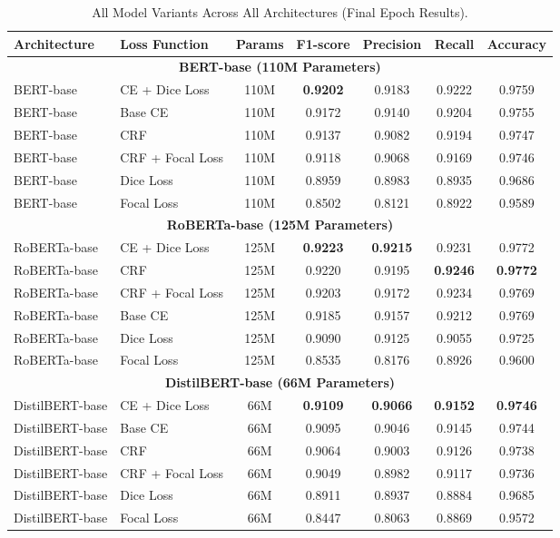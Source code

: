 \begin{table}[H]
    \centering
    \caption{All Model Variants Across All Architectures (Final Epoch Results).}
    \small
    \begin{tabular}{l l c c c c c}
        \hline
        \textbf{Architecture} & \textbf{Loss Function} & \textbf{Params} & \textbf{F1-score} & \textbf{Precision} & \textbf{Recall} & \textbf{Accuracy} \\
        \hline
        \multicolumn{7}{c}{\textbf{BERT-base (110M Parameters)}} \\
        \hline
        BERT-base & CE + Dice Loss & 110M & \textbf{0.9202} & 0.9183 & 0.9222 & 0.9759 \\
        BERT-base & Base CE & 110M & 0.9172 & 0.9140 & 0.9204 & 0.9755 \\
        BERT-base & CRF & 110M & 0.9137 & 0.9082 & 0.9194 & 0.9747 \\
        BERT-base & CRF + Focal Loss & 110M & 0.9118 & 0.9068 & 0.9169 & 0.9746 \\
        BERT-base & Dice Loss & 110M & 0.8959 & 0.8983 & 0.8935 & 0.9686 \\
        BERT-base & Focal Loss & 110M & 0.8502 & 0.8121 & 0.8922 & 0.9589 \\
        \hline
        \multicolumn{7}{c}{\textbf{RoBERTa-base (125M Parameters)}} \\
        \hline
        RoBERTa-base & CE + Dice Loss & 125M & \textbf{0.9223} & \textbf{0.9215} & 0.9231 & 0.9772 \\
        RoBERTa-base & CRF & 125M & 0.9220 & 0.9195 & \textbf{0.9246} & \textbf{0.9772} \\
        RoBERTa-base & CRF + Focal Loss & 125M & 0.9203 & 0.9172 & 0.9234 & 0.9769 \\
        RoBERTa-base & Base CE & 125M & 0.9185 & 0.9157 & 0.9212 & 0.9769 \\
        RoBERTa-base & Dice Loss & 125M & 0.9090 & 0.9125 & 0.9055 & 0.9725 \\
        RoBERTa-base & Focal Loss & 125M & 0.8535 & 0.8176 & 0.8926 & 0.9600 \\
        \hline
        \multicolumn{7}{c}{\textbf{DistilBERT-base (66M Parameters)}} \\
        \hline
        DistilBERT-base & CE + Dice Loss & 66M & \textbf{0.9109} & \textbf{0.9066} & \textbf{0.9152} & \textbf{0.9746} \\
        DistilBERT-base & Base CE & 66M & 0.9095 & 0.9046 & 0.9145 & 0.9744 \\
        DistilBERT-base & CRF & 66M & 0.9064 & 0.9003 & 0.9126 & 0.9738 \\
        DistilBERT-base & CRF + Focal Loss & 66M & 0.9049 & 0.8982 & 0.9117 & 0.9736 \\
        DistilBERT-base & Dice Loss & 66M & 0.8911 & 0.8937 & 0.8884 & 0.9685 \\
        DistilBERT-base & Focal Loss & 66M & 0.8447 & 0.8063 & 0.8869 & 0.9572 \\
        \hline
    \end{tabular}
    \label{tab:comprehensive_all_models}
\end{table}

